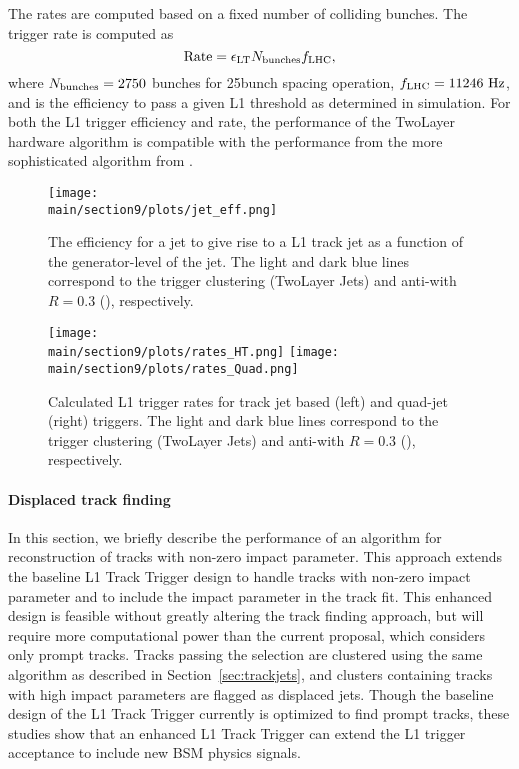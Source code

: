 The rates are computed based on a fixed number of colliding bunches. The trigger rate is computed as
\begin{equation*}
  \text{Rate} = \epsilon_\mathrm{LT} N_\mathrm{bunches} f_\mathrm{LHC},
\end{equation*}
where $N_\mathrm{bunches}=2750$ bunches for 25\Uns bunch spacing operation, $\fLHC = 11246\UHz$, and \effLT is the efficiency to pass a given L1 threshold as determined
in simulation. For both the L1 trigger efficiency and rate, the performance of the TwoLayer hardware algorithm is compatible with the performance from the more sophisticated algorithm
from \FASTJET.

\begin{figure*}[hbtp]\centering
 \texttt{[image: \\main/section9/plots/jet\_eff.png]}
 \caption{The efficiency for a jet to give rise to a L1 track jet as a function of the generator-level \pt of the jet.
 The light and dark blue lines correspond to the trigger clustering (TwoLayer Jets) and anti-\kt with $R =0.3$ (\FASTJET), respectively.}
  \label{fig:jeteff}
\end{figure*}%

\begin{figure*}[hbtp]\centering
 \texttt{[image: \\main/section9/plots/rates\_HT.png]}
 \texttt{[image: \\main/section9/plots/rates\_Quad.png]}
 \caption{Calculated L1 trigger rates for track jet based \HT (left) and quad-jet (right) triggers.
 The light and dark blue lines correspond to the trigger clustering (TwoLayer Jets) and anti-\kt with $R =0.3$ (\FASTJET), respectively.}
  \label{fig:rates}
\end{figure*}%

\paragraph{Displaced track finding}

In this section, we briefly describe the performance of an algorithm for reconstruction of tracks with non-zero impact parameter. This approach extends the baseline L1 Track Trigger design to 
handle tracks with non-zero impact parameter and to include the impact parameter in the track fit. This enhanced design is feasible without greatly altering the track finding approach, but will 
require more computational power than the current proposal, which considers only prompt tracks. Tracks passing the selection are clustered using the same algorithm as described in Section~\ref{sec:trackjets}, 
and clusters containing tracks with high impact parameters are flagged as displaced jets. Though the baseline design of the L1 Track Trigger currently is optimized to find prompt tracks, these 
studies show that an enhanced L1 Track Trigger can extend the L1 trigger acceptance to include new BSM physics signals.

